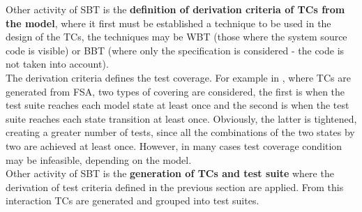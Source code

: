 Other activity of \ac{SBT} is the
\textbf{definition of derivation criteria of \ac{TC}s from the model}, where it first must be established a technique to be used in the design of the \ac{TC}s,
the techniques may be \ac{WBT} (those where the system source code is visible) or \ac{BBT} (where only the specification is considered - the code is not taken into account).\\
The derivation criteria defines the test coverage. For example in \cite{Lindholm06model-basedtesting}, where \ac{TC}s are generated from \ac{FSA},
two types of covering are considered, the first is when the test suite reaches each model state at least once and the second
is when the test suite reaches each state transition at least once.
Obviously, the latter is tightened, creating a greater number of tests, since all the combinations of the two states by two
are achieved at least once. However, in many cases test coverage condition may be infeasible, depending on the model.\\

Other activity of \ac{SBT} is the
\textbf{generation of \ac{TC}s and test suite} where the derivation of test criteria defined in the previous section are applied.
From this interaction \ac{TC}s are generated and grouped into test suites.

